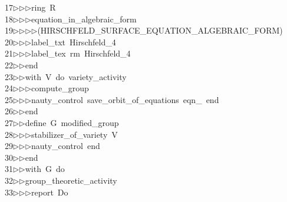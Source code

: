 \begin{tabbing}
17\>$\triangleright$\>$\triangleright$\>$\triangleright$\>ring\ R\ \\[0pt]
18\>$\triangleright$\>$\triangleright$\>$\triangleright$\>equation\_in\_algebraic\_form\ \\[0pt]
19\>$\triangleright$\>$\triangleright$\>$\triangleright$\>$\triangleright$\>(HIRSCHFELD\_SURFACE\_EQUATION\_ALGEBRAIC\_FORM)\ \\[0pt]
20\>$\triangleright$\>$\triangleright$\>$\triangleright$\>label\_txt\ Hirschfeld\_4\ \\[0pt]
21\>$\triangleright$\>$\triangleright$\>$\triangleright$\>label\_tex\ rm\ Hirschfeld\_4\ \\[0pt]
22\>$\triangleright$\>$\triangleright$\>end\ \\[0pt]
23\>$\triangleright$\>$\triangleright$\>with\ V\ do\ variety\_activity\ \\[0pt]
24\>$\triangleright$\>$\triangleright$\>$\triangleright$\>compute\_group\ \\[0pt]
25\>$\triangleright$\>$\triangleright$\>$\triangleright$\>nauty\_control\ save\_orbit\_of\_equations\ eqn\_\ end\ \\[0pt]
26\>$\triangleright$\>$\triangleright$\>end\ \\[0pt]
27\>$\triangleright$\>$\triangleright$\>define\ G\ modified\_group\ \\[0pt]
28\>$\triangleright$\>$\triangleright$\>$\triangleright$\>stabilizer\_of\_variety\ V\ \\[0pt]
29\>$\triangleright$\>$\triangleright$\>$\triangleright$\>nauty\_control\ end\ \\[0pt]
30\>$\triangleright$\>$\triangleright$\>end\ \\[0pt]
31\>$\triangleright$\>$\triangleright$\>with\ G\ do\ \\[0pt]
32\>$\triangleright$\>$\triangleright$\>group\_theoretic\_activity\ \\[0pt]
33\>$\triangleright$\>$\triangleright$\>$\triangleright$\>report\ Do\ \\[0pt]

\end{tabbing}
